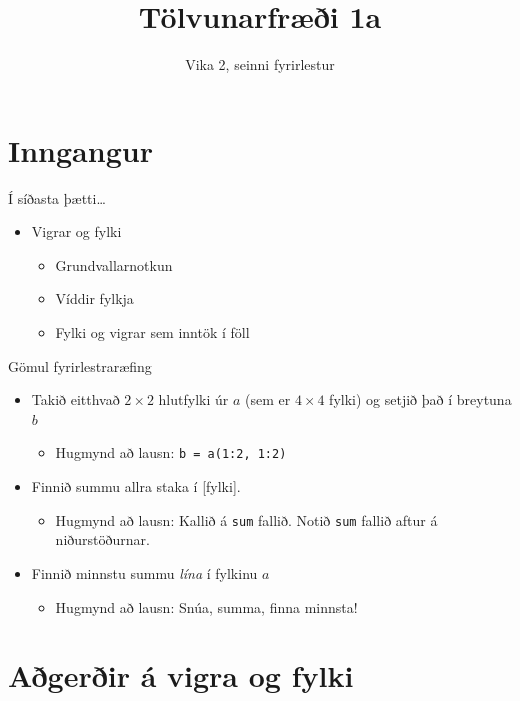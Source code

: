 \documentclass[handout]{beamer}
\title{Tölvunarfræði 1a}
\subtitle{Vika 2, seinni fyrirlestur}
\begin{document}
\begin{frame}
\titlepage
\end{frame}

\section{Inngangur}

\begin{frame}{Í síðasta þætti\ldots}
\begin{itemize}
 \item Vigrar og fylki
 \begin{itemize}
  \item Grundvallarnotkun
  \item Víddir fylkja
  \item Fylki og vigrar sem inntök í föll
 \end{itemize}
\end{itemize}
\end{frame}

\begin{frame}[fragile]{Gömul fyrirlestraræfing}
\begin{itemize}
 \item Takið eitthvað $2 \times 2$ hlutfylki úr $a$ (sem er $4 \times 4$ fylki) og setjið það í breytuna $b$ \pause
 \begin{itemize}
  \item Hugmynd að lausn: \texttt{b = a(1:2, 1:2)} \pause
 \end{itemize}
 \item Finnið summu allra staka í [fylki]. \pause
 \begin{itemize}
  \item Hugmynd að lausn: Kallið á \texttt{sum} fallið. Notið \texttt{sum} fallið aftur á niðurstöðurnar. \pause
 \end{itemize}
 \item Finnið minnstu summu \emph{lína} í fylkinu $a$ \pause
 \begin{itemize}
  \item Hugmynd að lausn: Snúa, summa, finna minnsta! \pause
 \end{itemize}
\end{itemize}
\end{frame}

\section{Aðgerðir á vigra og fylki}
\end{document}
